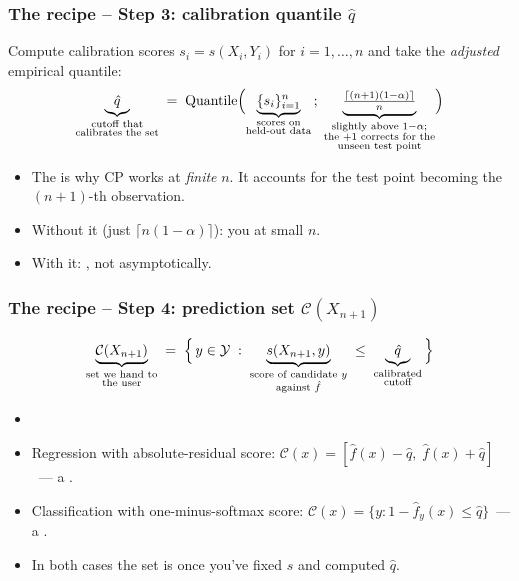 \documentclass[11pt, aspectratio=169, xcolor={dvipsnames}, usepdftitle=false]{beamer}
\begin{document}
\begin{frame}
\frametitle{The recipe -- Step 3: calibration quantile $\hat{q}$}
Compute calibration scores $s_i = s(X_i, Y_i)$ for $i = 1, \ldots, n$ and take the \emph{adjusted} empirical quantile:
\begin{equation*}
\underbrace{\hat{q}}_{\substack{\text{cutoff that}\\\text{calibrates the set}}}
\;=\;
\text{Quantile}\Bigl(
\underbrace{\{s_i\}_{i=1}^{n}}_{\substack{\text{scores on}\\\text{held-out data}}}
\,;\;
\underbrace{\tfrac{\lceil (n+1)(1-\alpha)\rceil}{n}}_{\substack{\text{slightly above } 1-\alpha;\\\text{the }+1\text{ corrects for the}\\\text{unseen test point}}}
\Bigr)
\end{equation*}
\begin{itemize}
\item The  is why CP works at \emph{finite} $n$. It accounts for the test point becoming the $(n{+}1)$-th observation.
\item Without it (just $\lceil n(1-\alpha)\rceil$): you  at small $n$.
\item With it: , not asymptotically.
\end{itemize}
\end{frame}

\begin{frame}
\frametitle{The recipe -- Step 4: prediction set $\mathcal{C}(X_{n+1})$}
\begin{equation*}
\underbrace{\mathcal{C}(X_{n+1})}_{\substack{\text{set we hand to}\\\text{the user}}}
\;=\;
\Bigl\{\, y \in \mathcal{Y} \;:\;
\underbrace{s(X_{n+1}, y)}_{\substack{\text{score of candidate } y\\\text{against } \hat{f}}}
\;\leq\;
\underbrace{\hat{q}}_{\substack{\text{calibrated}\\\text{cutoff}}}
\,\Bigr\}
\end{equation*}
\begin{itemize}
\item {}
\item Regression with absolute-residual score: $\mathcal{C}(x) = [\hat{f}(x) - \hat{q},\; \hat{f}(x) + \hat{q}]$~--- a .
\item Classification with one-minus-softmax score: $\mathcal{C}(x) = \{y : 1 - \hat{f}_y(x) \leq \hat{q}\}$~--- a .
\item In both cases the set is  once you've fixed $s$ and computed $\hat{q}$.
\end{itemize}
\end{frame}
\end{document}
